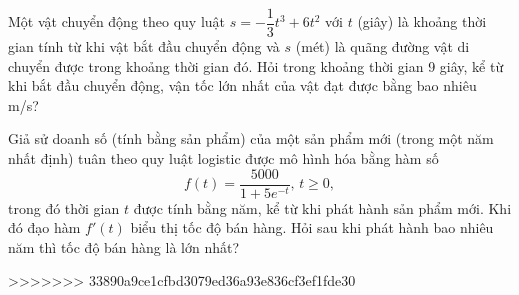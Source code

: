 \begin{ex}%
    Một vật chuyển động theo quy luật $s=-\dfrac{1}{3} t^3 + 6 t^2$ với $t$ (giây) là khoảng thời gian tính từ khi vật bắt đầu chuyển động và $s$ (mét) là quãng đường vật di chuyển được trong khoảng thời gian đó. Hỏi trong khoảng thời gian 9 giây, kể từ khi bắt đầu chuyển động, vận tốc lớn nhất của vật đạt được bằng bao nhiêu m/s?
\end{ex}
\begin{ex}%
    Giả sử doanh số (tính bằng sản phẩm) của một sản phẩm mới (trong một năm nhất định) tuân theo quy luật logistic được mô hình hóa bằng hàm số \[f(t)=\dfrac{5000}{1+5e^{-t}},\, t\ge0,\]
    trong đó thời gian $t$ được tính bằng năm, kể từ khi phát hành sản phẩm mới. Khi đó đạo hàm $f'(t)$ biểu thị tốc độ bán hàng. Hỏi sau khi phát hành bao nhiêu năm thì tốc độ bán hàng là lớn nhất?
\end{ex}
>>>>>>> 33890a9ce1cfbd3079ed36a93e836cf3ef1fde30
